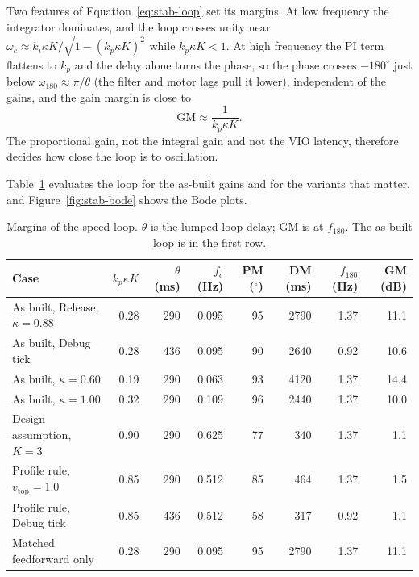 Two features of Equation~\eqref{eq:stab-loop} set its margins.
At low frequency the integrator dominates, and the loop crosses unity near $\omega_c \approx k_i \kappa K / \sqrt{1 - (k_p \kappa K)^2}$ while $k_p \kappa K < 1$.
At high frequency the PI term flattens to $k_p$ and the delay alone turns the phase, so the phase crosses $-180^\circ$ just below $\omega_{180} \approx \pi / \theta$ (the filter and motor lags pull it lower), independent of the gains, and the gain margin is close to
\begin{equation}
  \mathrm{GM} \approx \frac{1}{k_p \kappa K}.
  \label{eq:stab-gm}
\end{equation}
The proportional gain, not the integral gain and not the VIO latency, therefore decides how close the loop is to oscillation.

Table~\ref{tab:stab-margins} evaluates the loop for the as-built gains and for the variants that matter, and Figure~\ref{fig:stab-bode} shows the Bode plots.

\begin{table}[ht]
\centering
\caption{Margins of the speed loop. $\theta$ is the lumped loop delay; GM is at $f_{180}$. The as-built loop is in the first row.}
\label{tab:stab-margins}
\small
\begin{tabular}{@{}l r r r r r r r@{}}
\toprule
Case & $k_p \kappa K$ & $\theta$ (ms) & $f_c$ (Hz) & PM ($^\circ$) & DM (ms) & $f_{180}$ (Hz) & GM (dB) \\
\midrule
As built, Release, $\kappa = 0.88$ & 0.28 & 290 & 0.095 & 95 & 2790 & 1.37 & 11.1 \\
As built, Debug tick & 0.28 & 436 & 0.095 & 90 & 2640 & 0.92 & 10.6 \\
As built, $\kappa = 0.60$ & 0.19 & 290 & 0.063 & 93 & 4120 & 1.37 & 14.4 \\
As built, $\kappa = 1.00$ & 0.32 & 290 & 0.109 & 96 & 2440 & 1.37 & 10.0 \\
\midrule
Design assumption, $K = 3$ & 0.90 & 290 & 0.625 & 77 & 340 & 1.37 & 1.1 \\
Profile rule, $v_{\text{top}} = 1.0$ & 0.85 & 290 & 0.512 & 85 & 464 & 1.37 & 1.5 \\
Profile rule, Debug tick & 0.85 & 436 & 0.512 & 58 & 317 & 0.92 & 1.1 \\
\midrule
Matched feedforward only & 0.28 & 290 & 0.095 & 95 & 2790 & 1.37 & 11.1 \\
\bottomrule
\end{tabular}
\end{table}

